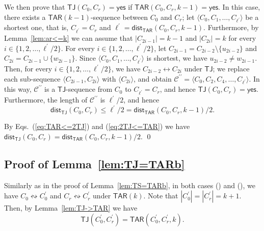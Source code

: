 \documentclass{llncs}
\newcommand{\onestep}{\leftrightarrow}
\newcommand{\sevstep}{\leftrightsquigarrow}
\newcommand{\TAR}[1]{\mathsf{TAR}(#1)}
\newcommand{\TJ}{\mathsf{TJ}}
\newcommand{\ini}{0}
\newcommand{\tar}{r}
\newcommand{\cliq}{C}
\newcommand{\YES}{\mathsf{yes}}
\newcommand{\TARins}[3]{\mathsf{TAR}(#1,#2,#3)}
\newcommand{\TJins}[2]{\mathsf{TJ}(#1,#2)}
\newcommand{\distTAR}[3]{\mathsf{dist_{TAR}}(#1,#2,#3)}
\newcommand{\distTJ}[2]{\mathsf{dist_{TJ}}(#1,#2)}
\newcounter{one}
\newcommand{\one}{{\rm \roman{one}}}
\newcounter{two}
\newcommand{\two}{{\rm \roman{two}}}
\begin{document}
	We then prove that $\TJins{\cliq_{\ini}}{\cliq_{\tar}} = \YES$ if $\TARins{\cliq_{\ini}}{\cliq_{\tar}}{k-1} = \YES$.
	In this case, there exists a $\TAR{k-1}$-sequence between $\cliq_{\ini}$ and $\cliq_{\tar}$; 
let $\langle \cliq_{0}, \cliq_{1}, \dots, \cliq_{\ell^\prime} \rangle$ be a shortest one, that is, $\cliq_{\ell^\prime} = \cliq_{\tar}$ and $\ell^\prime = \distTAR{\cliq_{\ini}}{\cliq_{\tar}}{k-1}$.
	Furthermore, by Lemma~\ref{lem:ar<=k} we can assume that $|\cliq_{2i-1}| = k-1$ and $|\cliq_{2i}| = k$ for every $i \in \{1, 2, \ldots, \ell^\prime/2 \}$. 
	For every $i \in \{1, 2, \ldots, \ell^\prime/2 \}$, let $\cliq_{2i-1} = \cliq_{2i-2} \setminus \{u_{2i-2} \}$ and $\cliq_{2i}  = \cliq_{2i-1} \cup \{w_{2i-1}\}$.
	Since $\langle \cliq_{0}, \cliq_{1}, \dots, \cliq_{\ell^\prime} \rangle$ is shortest, we have $u_{2i-2} \neq w_{2i-1}$.
	Then, for every $i \in \{1, 2, \ldots, \ell^\prime/2 \}$, we have $\cliq_{2i-2} \onestep C_{2i}$ under $\TJ$;
we replace each sub-sequence $\langle \cliq_{2i-1}, \cliq_{2i} \rangle$ with $\langle \cliq_{2i} \rangle$, and obtain $\mathcal{C}^{\prime \prime} = \langle \cliq_0, \cliq_2, \cliq_4, \ldots, \cliq_{\ell^\prime} \rangle$.
	In this way, $\mathcal{C}^{\prime \prime}$ is a $\TJ$-sequence from $\cliq_{\ini}$ to $\cliq_{\ell^\prime} = \cliq_{\tar}$, and hence $\TJins{\cliq_{\ini}}{\cliq_{\tar}} = \YES$. 
	Furthermore, the length of $\mathcal{C}^{\prime \prime}$ is $\ell^\prime/2$, and hence 
	\begin{equation} \label{eq:2TJ<=TAR}
		\distTJ{\cliq_{\ini}}{\cliq_{\tar}} \le \ell^\prime/2 = \distTAR{\cliq_{\ini}}{\cliq_{\tar}}{k-1}/2. 
	\end{equation}

	By Eqs.~(\ref{eq:TAR<=2TJ}) and (\ref{eq:2TJ<=TAR}) we have $\distTJ{\cliq_{\ini}}{\cliq_{\tar}} = \distTAR{\cliq_{\ini}}{\cliq_{\tar}}{k-1} /2$.
	\qed


	
	
	
	\subsection{Proof of Lemma~\ref{lem:TJ=TARb}}
Similarly as in the proof of Lemma~\ref{lem:TS=TARb}, in both cases (\one) and (\two), we have $\cliq_{\ini} \sevstep \cliq_{\ini}^\prime$ and $\cliq_{\tar} \sevstep \cliq_{\tar}^\prime$ under $\TAR{k}$.
	Note that $|\cliq_{\ini}^\prime| = |\cliq_{\tar}^\prime| = k+1$. 
	Then, by Lemma~\ref{lem:TJ->TAR} we have
	\begin{equation} \label{eq:TJ=TAR}
		\TJins{\cliq_{\ini}^\prime}{\cliq_{\tar}^\prime} = \TARins{\cliq_{\ini}^\prime}{\cliq_{\tar}^\prime}{k}.
	\end{equation}
	
\end{document}
